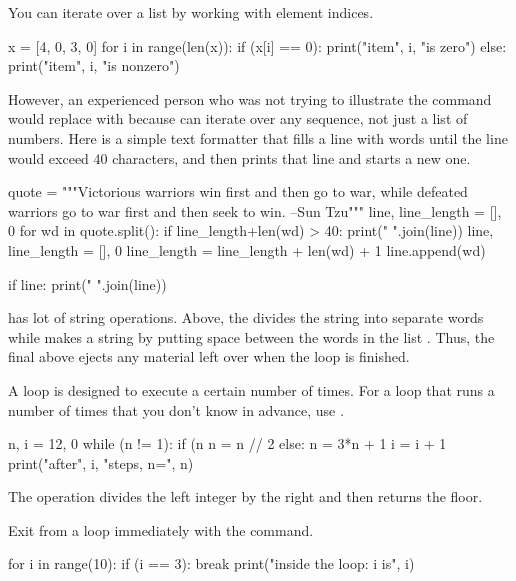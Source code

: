 You can iterate over a list by working with element indices.
\begin{pythonconsole}
x = [4, 0, 3, 0]
for i in range(len(x)):
    if (x[i] == 0):
        print("item", i, "is zero")
    else:
        print("item", i, "is nonzero")

\end{pythonconsole}
However, an experienced  \python{} person who was not trying to illustrate 
the  command
would replace 
with  because
 can iterate over any sequence, not just
a list of numbers.
Here is a simple text formatter that fills a line with words until
the line would exceed $40$ characters, and then
prints that line and starts a new one.
\begin{pythonconsole}
quote = """Victorious warriors win first and then go to war, 
while defeated warriors go to war first and then seek to win. 
--Sun Tzu"""
line, line_length = [], 0
for wd in quote.split():
    if line_length+len(wd) > 40:
        print(" ".join(line))
        line, line_length = [], 0
    line_length = line_length + len(wd) + 1
    line.append(wd)

if line:
    print(" ".join(line))

\end{pythonconsole}
\python{} has lot of string operations.
Above, the  divides the string into separate words while
 makes a string by putting  space between the words in the list 
.
Thus, the final  above ejects any material left over
when the  loop is finished.

A  loop is designed to execute a certain
number of times.
For a loop that runs a number of times that you don't know in advance, 
use .%
\begin{pythonconsole}
n, i = 12, 0
while (n != 1):
    if (n %
        n = n // 2
    else:
        n = 3*n + 1
    i = i + 1
    print("after", i, "steps, n=", n)
    
\end{pythonconsole}
The \inlinecode{//} operation divides the left integer by the right and then returns the floor.

Exit from a loop immediately with the  command.
\begin{pythonconsole}
for i in range(10):
    if (i == 3):
        break
        print("inside the loop: i is", i)
        
\end{pythonconsole}


